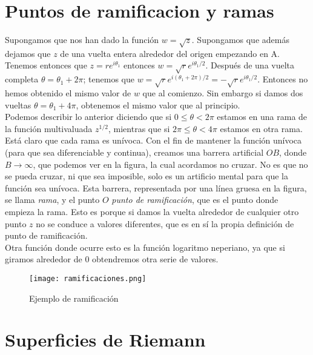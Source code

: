 \documentclass[12pt]{book}
\begin{document}
\section{Puntos de ramificacion y ramas}

Supongamos que nos han dado la función  $w = \sqrt{z}$. Supongamos que además dejamos que $z$ de una vuelta entera alrededor del origen empezando en A. Tenemos entonces que $z=re^{i\theta_1}$ entonces $w = \sqrt{r} e^{i \theta_1 /2}$. Después de una vuelta completa $\theta = \theta_1 + 2\pi$; tenemos que $w = \sqrt{r} e^{i (\theta_1 +2 \pi)/2} = - \sqrt{r} e^{i \theta_1 /2}$. Entonces no hemos obtenido el mismo valor de $w$ que al comienzo. Sin embargo si damos dos vueltas $\theta = \theta_1 + 4 \pi$, obtenemos el mismo valor que al principio.  \\

Podemos describir lo anterior diciendo que si $0 \leq \theta < 2 \pi$ estamos en una rama de la función multivaluada $z^{1/2}$, mientras que si $ 2 \pi \leq \theta < 4 \pi $ estamos en otra rama. \\

Está claro que cada rama es unívoca. Con el fin de mantener la función unívoca (para que sea diferenciable y continua), creamos una barrera artificial $OB$, donde $B \rightarrow \infty$, que podemos ver en la figura, la cual acordamos no cruzar. No es que no se pueda cruzar, ni que sea imposible, solo es un artificio mental para que la función sea unívoca. Esta barrera, representada por una línea gruesa en la figura, se llama \textit{rama}, y el punto $O$ \textit{punto de ramificación}, que es el punto donde empieza la rama. Esto es porque si damos la vuelta alrededor de cualquier otro punto $z$ no se conduce a valores diferentes, que es en sí la propia definición de punto de ramificación. \\

Otra función donde ocurre esto es la función logaritmo neperiano, ya que si giramos alrededor de $0$ obtendremos otra serie de valores.

\begin{figure}[h!] \centering
\texttt{[image: ramificaciones.png]}
\caption{Ejemplo de ramificación}
\end{figure}



\section{Superficies de Riemann} 
\end{document}
